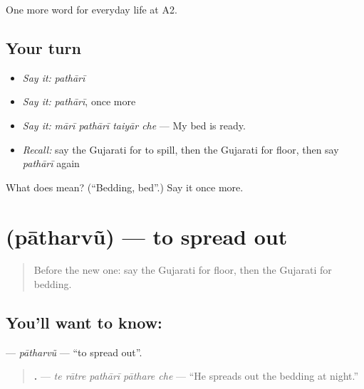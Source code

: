 \begin{grammarlens}[title={What you've built}]
One more word for everyday life at A2.
\end{grammarlens}

\subsection*{Your turn}
\begin{itemize}
\raggedright
  \item \emph{Say it:} \emph{pathārī}
  \item \emph{Say it:} \emph{pathārī}, once more
  \item \emph{Say it:} \emph{mārī pathārī taiyār che} — My bed is ready.
  \item \emph{Recall:} say the Gujarati for to spill, then the Gujarati for floor, then say \emph{pathārī} again
\end{itemize}

\begin{tcolorbox}[breakable,colback=teal!4,colframe=teal!35!black,title={Before you move on}]
What does  mean? (\textquotedblleft{}Bedding, bed\textquotedblright{}.) Say it once more.
\end{tcolorbox}
\section[\texorpdfstring{\gu{પાથરવું} (pātharvũ)}{પાથરવું (pātharvũ)}]{ (pātharvũ) — to spread out}

\label{lesson:GU-C160-patharvu}



\begin{quote}
Before the new one: say the Gujarati for floor, then the Gujarati for bedding.
\end{quote}

\subsection*{You'll want to know: }
\textbf{} — \emph{pātharvũ} — \textquotedblleft{}to spread out\textquotedblright{}.

\begin{quote}
\textbf{    .} — \emph{te rātre pathārī pāthare che} — \textquotedblleft{}He spreads out the bedding at night.\textquotedblright{}
\end{quote}

